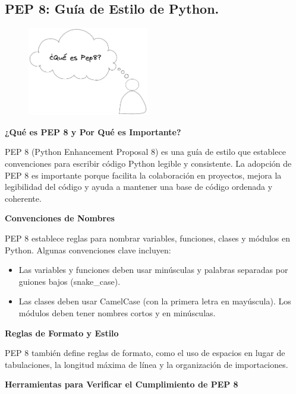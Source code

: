 \documentclass[
  a4paper,
  DIV=11,
  numbers=noendperiod,
  onepage,
  openany]{scrreprt}
\begin{document}
\subsection{PEP 8: Guía de Estilo de
Python.}\label{pep-8-guuxeda-de-estilo-de-python.}

\begin{figure}

{\centering \includegraphics[width=2.08333in,height=\textheight]{unidades/unidad1/images/Que es pep8.png}

}

\end{figure}

\textbf{¿Qué es PEP 8 y Por Qué es Importante?}

PEP 8 (Python Enhancement Proposal 8) es una guía de estilo que
establece convenciones para escribir código Python legible y
consistente. La adopción de PEP 8 es importante porque facilita la
colaboración en proyectos, mejora la legibilidad del código y ayuda a
mantener una base de código ordenada y coherente.

\textbf{Convenciones de Nombres}

PEP 8 establece reglas para nombrar variables, funciones, clases y
módulos en Python. Algunas convenciones clave incluyen:

\begin{itemize}
\item
  Las variables y funciones deben usar minúsculas y palabras separadas
  por guiones bajos (snake\_case).
\item
  Las clases deben usar CamelCase (con la primera letra en mayúscula).
  Los módulos deben tener nombres cortos y en minúsculas.
\end{itemize}

\textbf{Reglas de Formato y Estilo}

PEP 8 también define reglas de formato, como el uso de espacios en lugar
de tabulaciones, la longitud máxima de línea y la organización de
importaciones.

\textbf{Herramientas para Verificar el Cumplimiento de PEP 8}
\end{document}
